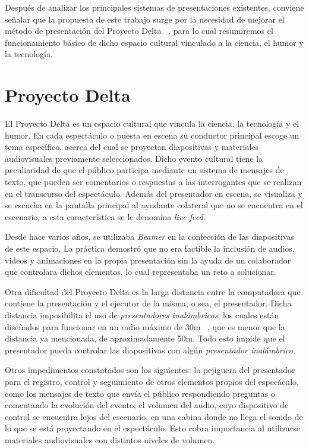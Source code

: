 
		Después de analizar los principales sistemas de presentaciones existentes, conviene señalar que la propuesta de este trabajo surge por la necesidad de mejorar el método de presentación del Proyecto Delta ~\cite{delta}, para lo cual resumiremos el funcionamiento básico de dicho espacio cultural vinculado a la ciencia, el humor y la tecnología.

	\section{Proyecto Delta} %
	\label{sec:proyecto_delta}

			El Proyecto Delta es un espacio cultural que vincula la ciencia, la tecnología y el humor. En cada espectáculo o puesta en escena su conductor principal escoge un tema específico, acerca del cual se proyectan diapositivas y materiales audiovisuales previamente seleccionados. Dicho evento cultural tiene la peculiaridad de que el público participa mediante un sistema de mensajes de texto, que pueden ser comentarios o respuestas a las interrogantes que se realizan en el transcurso del espectáculo. Además del presentador en escena, se visualiza y se escucha en la pantalla principal al ayudante colateral que no se encuentra en el escenario, a esta característica se le denomina \textit{live feed}.


			Desde hace varios años, se utilizaba \textit{Beamer} en la confección de las diapositivas de este espacio. La práctica demostró que no era factible la inclusión de audios, videos y animaciones en la propia presentación sin la ayuda de un colaborador que controlara dichos elementos, lo cual representaba un reto a solucionar.	


			Otra dificultad del Proyecto Delta es la larga distancia entre la computadora que contiene la presentación y el ejecutor de la misma, o sea, el presentador. Dicha distancia imposibilita el uso de \textit{presentadores inalámbricos}, los cuales están diseñados para funcionar en un radio máximo de 30m ~\cite{tikitiki}, que es menor que la distancia ya mencionada, de aproximadamente 50m. Todo esto impide que el presentador pueda controlar las diapositivas con algún \textit{presentador inalámbrico}.

			Otros impedimentos constatados son los siguientes: la pejiguera del presentador para el registro, control y seguimiento de otros elementos propios del especáculo, como los mensajes de texto que envía el público respondiendo preguntas o comentando la evolución del evento; el volumen del audio, cuyo dispositivo de control se encuentra lejos del escenario, en una cabina donde no llega el sonido de lo que se está proyectando en el espectáculo. Esto cobra importancia al utilizarse materiales audiovisuales con distintos niveles de volumen.

